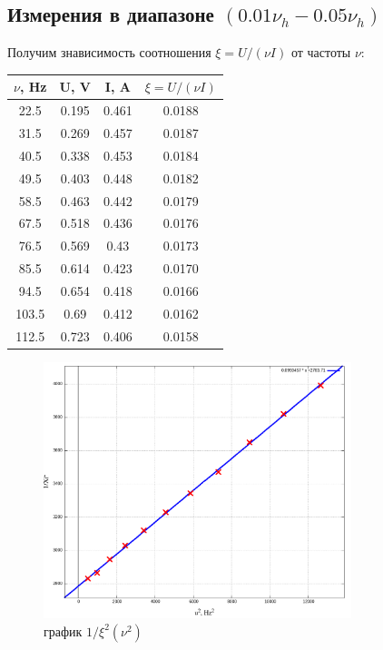 \documentclass{article}
\begin{document}
\subsection{Измерения в диапазоне \((0.01\nu_h - 0.05\nu_h)\)}
Получим знависимость соотношения \( \xi = U/(\nu I) \) от частоты \(\nu\):
\begin{table}[H]
    \centering
    \begin{tabular}{|c|c|c|c|}
    \hline
    \(\nu\), Hz & U, V  & I, A  & \(\xi = U/(\nu I)\) \\\hline
    22.5 & 0.195 & 0.461 & 0.0188   \\\hline
    31.5 & 0.269 & 0.457 & 0.0187   \\\hline
    40.5 & 0.338 & 0.453 & 0.0184   \\\hline
    49.5 & 0.403 & 0.448 & 0.0182   \\\hline
    58.5 & 0.463 & 0.442 & 0.0179   \\\hline
    67.5 & 0.518 & 0.436 & 0.0176   \\\hline
    76.5 & 0.569 & 0.43  & 0.0173   \\\hline
    85.5 & 0.614 & 0.423 & 0.0170   \\\hline
    94.5 & 0.654 & 0.418 & 0.0166   \\\hline
    103.5& 0.69  & 0.412 & 0.0162   \\\hline
    112.5& 0.723 & 0.406 & 0.0158   \\\hline
    \end{tabular}
\end{table}

\begin{figure}[H]
    \centering
    \includegraphics[width=0.8\textwidth]{1.png}
    \caption{график \( 1/\xi^2(\nu^2) \)}
    \label{plot1}
\end{figure}
\end{document}
